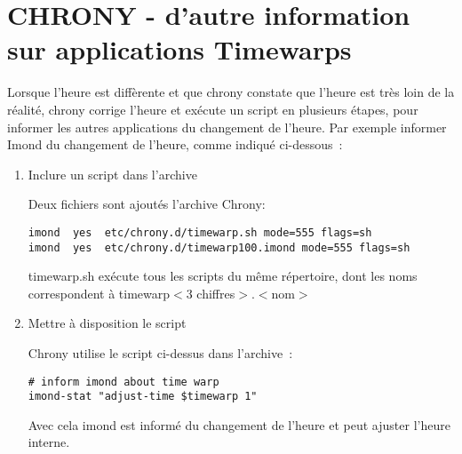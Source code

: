 
\section{CHRONY - d'autre information sur applications Timewarps}

Lorsque l'heure est diffèrente et que chrony constate que l'heure est très 
loin de la réalité, chrony corrige l'heure et exécute un script en plusieurs 
étapes, pour informer les autres applications du changement de l'heure. Par 
exemple informer Imond du changement de l'heure, comme indiqué ci-dessous~:

\begin{enumerate}
\item Inclure un script dans l'archive

Deux fichiers sont ajoutés l'archive Chrony:

\begin{verbatim}
imond  yes  etc/chrony.d/timewarp.sh mode=555 flags=sh
imond  yes  etc/chrony.d/timewarp100.imond mode=555 flags=sh
\end{verbatim}

timewarp.sh exécute tous les scripts du même répertoire, dont les noms 
correspondent à timewarp$<$3 chiffres$>$.$<$nom$>$

\item Mettre à disposition le script 

Chrony utilise le script ci-dessus dans l'archive~:

\begin{verbatim}
# inform imond about time warp
imond-stat "adjust-time $timewarp 1"
\end{verbatim}

Avec cela imond est informé du changement de l'heure et peut ajuster 
l'heure interne.
\end{enumerate}
